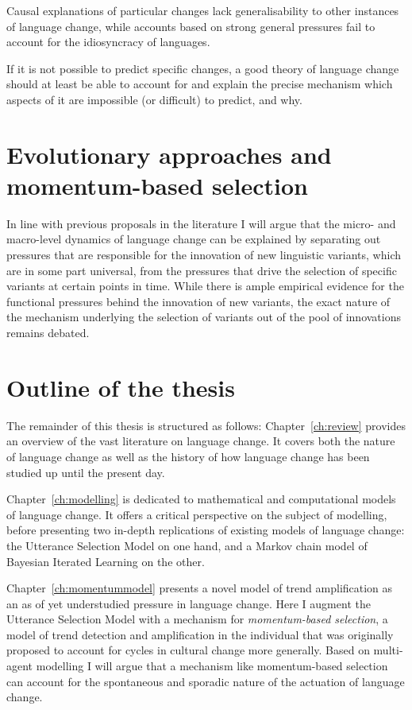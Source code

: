 Causal explanations of particular changes lack generalisability to other instances of language change, while accounts based on strong general pressures fail to account for the idiosyncracy of languages.


If it is not possible to predict specific changes, a good theory of language change should at least be able to account for and explain the precise mechanism which aspects of it are impossible (or difficult) to predict, and why.

\section{Evolutionary approaches and momentum-based selection}

In line with previous proposals in the literature I will argue that the micro- and macro-level dynamics of language change can be explained by separating out pressures that are responsible for the innovation of new linguistic variants, which are in some part universal, from the pressures that drive the selection of specific variants at certain points in time.
While there is ample empirical evidence for the functional pressures behind the innovation of new variants, the exact nature of the mechanism underlying the selection of variants out of the pool of innovations remains debated.

\section{Outline of the thesis}

The remainder of this thesis is structured as follows: Chapter~\ref{ch:review} provides an overview of the vast literature on language change. It covers both the nature of language change as well as the history of how language change has been studied up until the present day. %

Chapter~\ref{ch:modelling} is dedicated to mathematical and computational models of language change. It offers a critical perspective on the subject of modelling, before presenting two in-depth replications of existing models of language change: the Utterance Selection Model on one hand, and a Markov chain model of Bayesian Iterated Learning on the other.

Chapter~\ref{ch:momentummodel} presents a novel model of trend amplification as an as of yet understudied pressure in language change. Here I augment the Utterance Selection Model with a mechanism for \emph{momentum-based selection}, a model of trend detection and amplification in the individual that was originally proposed to account for cycles in cultural change more generally. Based on multi-agent modelling I will argue that a mechanism like momentum-based selection can account for the spontaneous and sporadic nature of the actuation of language change.

